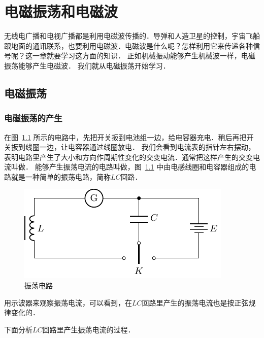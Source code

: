 \chapter{电磁振荡和电磁波}\label{chapter-electromagnetic-oscillations-and-waves}

无线电广播和电视广播都是利用电磁波传播的．导弹和人造卫星的控制，宇宙飞船跟地面的通讯联系，也要利用电磁波．电磁波是什么呢？怎样利用它来传递各种信号呢？这一章就要学习这方面的知识．
正如机械振动能够产生机械波一样，电磁振荡能够产生电磁波．
我们就从电磁振荡开始学习．

\section{电磁振荡}
\subsection{电磁振荡的产生}


在图~\ref{fig_C_4-1} 所示的电路中，先把开关扳到电池组一边，给电容器充电．稍后再把开关扳到线圈一边，让电容器通过线圈放电．
我们会看到电流表的指针左右摆动，表明电路里产生了大小和方向作周期性变化的交变电流．通常把这样产生的交变电流叫做．
能够产生振荡电流的电路叫做，图~\ref{fig_C_4-1} 中由电感线圈和电容器组成的电路就是一种简单的振荡电路，简称$LC$回路．

\begin{figure}[htbp]
	\centering
	\includegraphics{fig/C/4-1.pdf}
	\caption{振荡电路}\label{fig_C_4-1}
\end{figure}


用示波器来观察振荡电流，可以看到，在$LC$回路里产生的振荡电流也是按正弦规律变化的．

下面分析$LC$回路里产生振荡电流的过程．

